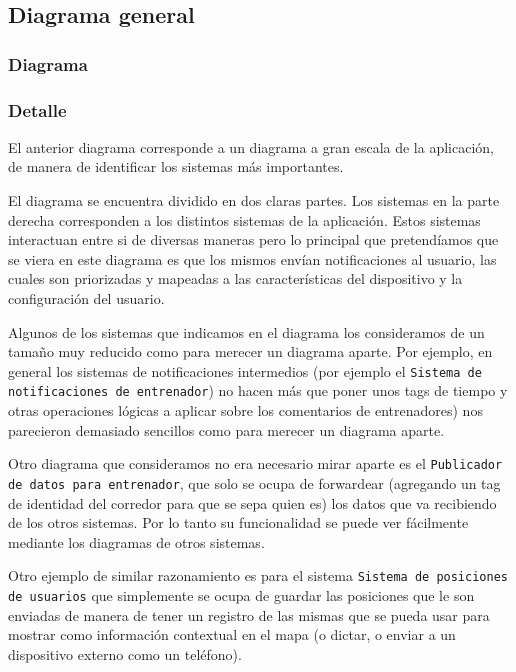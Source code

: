 \subsection{Diagrama general}
\subsubsection{Diagrama}


\subsubsection{Detalle}

El anterior diagrama corresponde a un diagrama a gran escala de la
aplicación, de manera de identificar los sistemas más importantes.

El diagrama se encuentra dividido en dos claras partes. Los sistemas
en la parte derecha corresponden a los distintos sistemas de la
aplicación. Estos sistemas interactuan entre si de diversas maneras pero lo 
principal que pretendíamos que se viera en este diagrama es que los mismos 
envían notificaciones al usuario, las cuales son priorizadas 
y mapeadas a las características del dispositivo y la configuración 
del usuario.

Algunos de los sistemas que indicamos en el diagrama los consideramos
de un tamaño muy reducido como para merecer un diagrama aparte. Por
ejemplo, en general los sistemas de notificaciones intermedios (por
ejemplo el \texttt{Sistema de notificaciones de entrenador}) no hacen
más que poner unos tags de tiempo y otras operaciones lógicas a aplicar
sobre los comentarios de entrenadores) nos parecieron demasiado sencillos
como para merecer un diagrama aparte.

Otro diagrama que consideramos no era necesario mirar aparte es el 
\texttt{Publicador de datos para entrenador}, que solo se ocupa de forwardear
(agregando un tag de identidad del corredor para que se sepa quien es) los datos
que va recibiendo de los otros sistemas. Por lo tanto su funcionalidad se puede
ver fácilmente mediante los diagramas de otros sistemas.

Otro ejemplo de similar razonamiento es para el sistema \texttt{Sistema de
posiciones de usuarios} que simplemente se ocupa de guardar las posiciones
que le son enviadas de manera de tener un registro de las mismas que se pueda
usar para mostrar como información contextual en el mapa (o dictar, o enviar
a un dispositivo externo como un teléfono).

